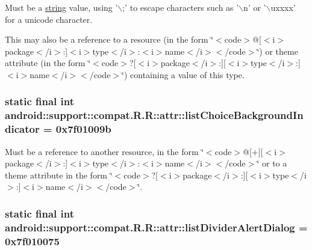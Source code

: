 Must be a \hyperlink{classandroid_1_1support_1_1compat_1_1_r_1_1string}{string} value, using '$\backslash$;' to escape characters such as '$\backslash$n' or '$\backslash$uxxxx' for a unicode character. 

This may also be a reference to a resource (in the form \char`\"{}$<$code$>$@\mbox{[}$<$i$>$package$<$/i$>$:\mbox{]}$<$i$>$type$<$/i$>$:$<$i$>$name$<$/i$>$$<$/code$>$\char`\"{}) or theme attribute (in the form \char`\"{}$<$code$>$?\mbox{[}$<$i$>$package$<$/i$>$:\mbox{]}\mbox{[}$<$i$>$type$<$/i$>$:\mbox{]}$<$i$>$name$<$/i$>$$<$/code$>$\char`\"{}) containing a value of this type. \hypertarget{classandroid_1_1support_1_1compat_1_1_r_1_1attr_a2a51187602f32b929f9666c8675e270}{
\subsubsection[{listChoiceBackgroundIndicator}]{\setlength{\rightskip}{0pt plus 5cm}static final int android::support::compat.R.R::attr::listChoiceBackgroundIndicator = 0x7f01009b}}
\label{classandroid_1_1support_1_1compat_1_1_r_1_1attr_a2a51187602f32b929f9666c8675e270}


Must be a reference to another resource, in the form \char`\"{}$<$code$>$@\mbox{[}+\mbox{]}\mbox{[}$<$i$>$package$<$/i$>$:\mbox{]}$<$i$>$type$<$/i$>$:$<$i$>$name$<$/i$>$$<$/code$>$\char`\"{} or to a theme attribute in the form \char`\"{}$<$code$>$?\mbox{[}$<$i$>$package$<$/i$>$:\mbox{]}\mbox{[}$<$i$>$type$<$/i$>$:\mbox{]}$<$i$>$name$<$/i$>$$<$/code$>$\char`\"{}. \hypertarget{classandroid_1_1support_1_1compat_1_1_r_1_1attr_ab4456d5cf17979abdd0eada59a9c460}{
\subsubsection[{listDividerAlertDialog}]{\setlength{\rightskip}{0pt plus 5cm}static final int android::support::compat.R.R::attr::listDividerAlertDialog = 0x7f010075}}
\label{classandroid_1_1support_1_1compat_1_1_r_1_1attr_ab4456d5cf17979abdd0eada59a9c460}


